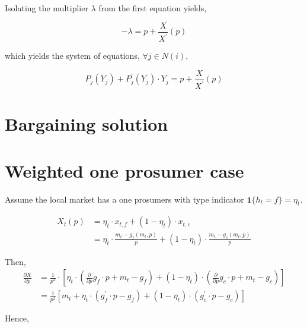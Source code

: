\documentclass[american]{scrartcl}
\begin{document}
Isolating the multiplier $\lambda$ from the first equation yields,

\begin{equation}
    - \lambda = p + \frac{X}{X^\prime}(p)
\end{equation}

which yields the system of equations, $\forall j \in N(i)$,

\begin{equation}
    P_j(Y_j) + P^\prime_j(Y_j) \cdot Y_j = p + \frac{X}{X^\prime}(p)
\end{equation}


\section{Bargaining solution}

\iffalse %

    \section{Weighted one prosumer case}

    Assume the local market has a one prosumers with type indicator $\mathbf{1}\{h_t = f\} = \eta_t$.

    \begin{equation}
        \begin{split}
            X_t(p) &= \eta_t \cdot x_{t, f} + (1 - \eta_t) \cdot x_{t, c} \\
            &= \eta_t \cdot \frac{m_t - g_f(m_t, p)}{p} + (1 - \eta_t) \cdot \frac{m_t - g_c(m_t, p)}{p}
        \end{split}
    \end{equation}


    Then,
    \begin{equation}
        \begin{split}
            \frac{\partial X}{\partial p} &= \frac{1}{p^2} \cdot \left[ \eta_t \cdot \left(\frac{\partial}{\partial p} g_f \cdot p + m_t - g_f \right) + (1 - \eta_t) \cdot \left(\frac{\partial}{\partial p} g_c \cdot p + m_t - g_c \right) \right] \\
            &=\frac{1}{p^2} \left[m_t + \eta_t \cdot \left( g^\prime_f \cdot p - g_f \right) + (1 - \eta_t) \cdot \left( g^\prime_c \cdot p - g_c \right) \right]
        \end{split}
    \end{equation}

    Hence,
\end{document}
